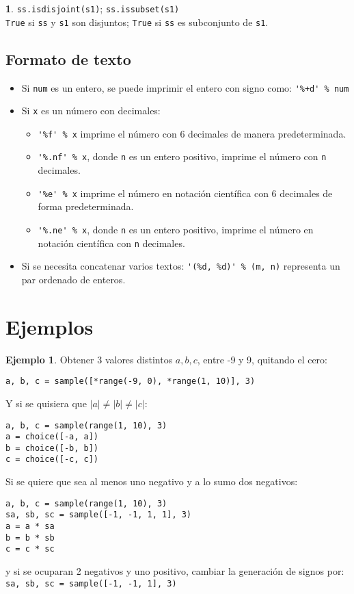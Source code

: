 \documentclass[12pt]{article}
\theoremstyle{definition}
\newtheorem{funcion}{}[section]
\newtheorem{ejem}{Ejemplo}
\begin{document}
\begin{funcion}
  \verb|ss.isdisjoint(s1)|; \verb|ss.issubset(s1)| \\[1ex]
  \verb|True| si \verb|ss| y \verb|s1| son disjuntos; \verb|True| si \verb|ss| es subconjunto de \verb|s1|.
\end{funcion}

\subsection{Formato de texto}
\label{formato}

\begin{itemize}
  \item Si \verb|num| es un entero, se puede imprimir el entero con signo como: \verb|'%+d' % num|
  \item Si \verb|x| es un número con decimales:
    \begin{itemize}
      \item \verb|'%f' % x| imprime el número con 6 decimales de manera predeterminada.
      \item \verb|'%.nf' % x|, donde \verb|n| es un entero positivo, imprime el número con \verb|n| decimales.
      \item \verb|'%e' % x| imprime el número en notación científica con 6 decimales de forma predeterminada.
      \item \verb|'%.ne' % x|, donde \verb|n| es un entero positivo, imprime el número en notación científica con \verb|n| decimales.
    \end{itemize}
  \item Si se necesita concatenar varios textos: \verb|'(%d, %d)' % (m, n)| representa un par ordenado de enteros.
\end{itemize}

\section{Ejemplos}
\begin{ejem}
Obtener 3 valores distintos $a,b,c$, entre -9 y 9, quitando el cero:
\begin{verbatim}
a, b, c = sample([*range(-9, 0), *range(1, 10)], 3)
\end{verbatim}

Y si se quisiera que $|a|\neq |b| \neq |c|$:
\begin{verbatim}
a, b, c = sample(range(1, 10), 3)
a = choice([-a, a])
b = choice([-b, b])
c = choice([-c, c])
\end{verbatim}

Si se quiere que sea al menos uno negativo y a lo sumo dos negativos:
\begin{verbatim}
a, b, c = sample(range(1, 10), 3)
sa, sb, sc = sample([-1, -1, 1, 1], 3)
a = a * sa
b = b * sb
c = c * sc
\end{verbatim}
y si se ocuparan 2 negativos y uno positivo, cambiar la generaci\'on de signos por: \\
\verb|sa, sb, sc = sample([-1, -1, 1], 3)|
\end{ejem}
\end{document}
